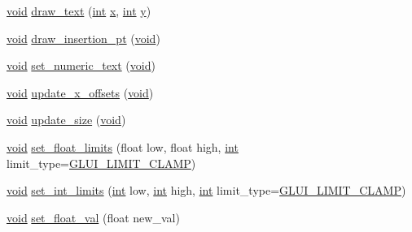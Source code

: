 \begin{DoxyCompactItemize}
\item 
\hyperlink{wglext_8h_a9e6b7f1933461ef318bb000d6bd13b83}{void} \hyperlink{class_g_l_u_i___edit_text_a37917739d5f240356d893b3d07d9afe6}{draw\+\_\+text} (\hyperlink{wglext_8h_a500a82aecba06f4550f6849b8099ca21}{int} \hyperlink{glext_8h_ad77deca22f617d3f0e0eb786445689fc}{x}, \hyperlink{wglext_8h_a500a82aecba06f4550f6849b8099ca21}{int} \hyperlink{glext_8h_a9298c7ad619074f5285b32c6b72bfdea}{y})
\item 
\hyperlink{wglext_8h_a9e6b7f1933461ef318bb000d6bd13b83}{void} \hyperlink{class_g_l_u_i___edit_text_acc67640b9e92d5c6c84e4f685762aaf4}{draw\+\_\+insertion\+\_\+pt} (\hyperlink{wglext_8h_a9e6b7f1933461ef318bb000d6bd13b83}{void})
\item 
\hyperlink{wglext_8h_a9e6b7f1933461ef318bb000d6bd13b83}{void} \hyperlink{class_g_l_u_i___edit_text_a7b1c3f892a2c340e8c7328a260d92d08}{set\+\_\+numeric\+\_\+text} (\hyperlink{wglext_8h_a9e6b7f1933461ef318bb000d6bd13b83}{void})
\item 
\hyperlink{wglext_8h_a9e6b7f1933461ef318bb000d6bd13b83}{void} \hyperlink{class_g_l_u_i___edit_text_a7875ec7ab7213fbe52370436b4a8af8c}{update\+\_\+x\+\_\+offsets} (\hyperlink{wglext_8h_a9e6b7f1933461ef318bb000d6bd13b83}{void})
\item 
\hyperlink{wglext_8h_a9e6b7f1933461ef318bb000d6bd13b83}{void} \hyperlink{class_g_l_u_i___edit_text_acb10946b2666d84c57a321cda5ab2abb}{update\+\_\+size} (\hyperlink{wglext_8h_a9e6b7f1933461ef318bb000d6bd13b83}{void})
\item 
\hyperlink{wglext_8h_a9e6b7f1933461ef318bb000d6bd13b83}{void} \hyperlink{class_g_l_u_i___edit_text_a3b46c3540795e49983394d3bfdb89fb6}{set\+\_\+float\+\_\+limits} (float low, float high, \hyperlink{wglext_8h_a500a82aecba06f4550f6849b8099ca21}{int} limit\+\_\+type=\hyperlink{glui_8h_ac968cb6b340a4e1cad7734abc769d934}{G\+L\+U\+I\+\_\+\+L\+I\+M\+I\+T\+\_\+\+C\+L\+A\+M\+P})
\item 
\hyperlink{wglext_8h_a9e6b7f1933461ef318bb000d6bd13b83}{void} \hyperlink{class_g_l_u_i___edit_text_a5761e028dc711efdc234f7211003a500}{set\+\_\+int\+\_\+limits} (\hyperlink{wglext_8h_a500a82aecba06f4550f6849b8099ca21}{int} low, \hyperlink{wglext_8h_a500a82aecba06f4550f6849b8099ca21}{int} high, \hyperlink{wglext_8h_a500a82aecba06f4550f6849b8099ca21}{int} limit\+\_\+type=\hyperlink{glui_8h_ac968cb6b340a4e1cad7734abc769d934}{G\+L\+U\+I\+\_\+\+L\+I\+M\+I\+T\+\_\+\+C\+L\+A\+M\+P})
\item 
\hyperlink{wglext_8h_a9e6b7f1933461ef318bb000d6bd13b83}{void} \hyperlink{class_g_l_u_i___edit_text_a2c0caddce6e11b8a303c8f247b8fbf0f}{set\+\_\+float\+\_\+val} (float new\+\_\+val)

\end{DoxyCompactItemize}

